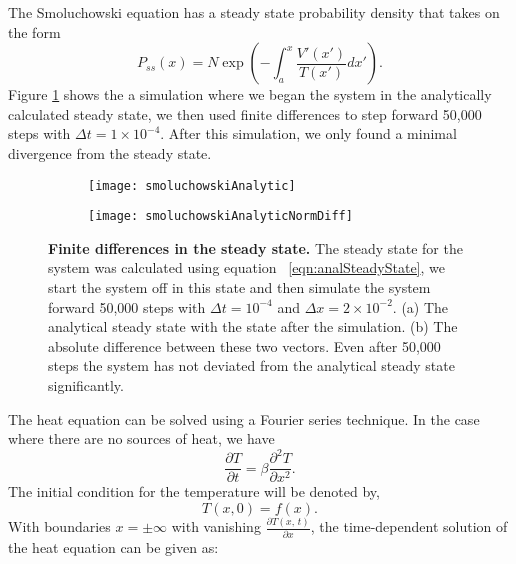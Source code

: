 The Smoluchowski equation has a steady state probability density that takes on the form
\begin{equation}
P_{ss}(x) = N \exp{\left(-\int_a^x \frac{V'(x')}{T(x')} dx' \right)}. \label{eqn:analSteadyState}
\end{equation}
Figure \ref{fig:smoluchowskiCompare} shows the a simulation where we began the system in the analytically calculated steady state, we then used finite differences to step forward 50,000 steps with $\Delta t = 1 \times 10^{-4}$. After this simulation, we only found a minimal divergence from the steady state.
\begin{figure}
	\begin{subfigure}{0.49\textwidth}
	\texttt{[image: smoluchowskiAnalytic]}
	\end{subfigure}
	\begin{subfigure}{0.49\textwidth}
	\texttt{[image: smoluchowskiAnalyticNormDiff]}
	\end{subfigure}
	\caption{\textbf{Finite differences in the steady state.} The steady state for the system was calculated using equation ~\ref{eqn:analSteadyState}, we start the system off in this state and then simulate the system forward 50,000 steps with $\Delta t = 10^{-4}$ and $\Delta x = 2 \times 10^{-2}$. (a) The analytical steady state with the state after the simulation. (b) The absolute difference between these two vectors. Even after 50,000 steps the system has not deviated from the analytical steady state significantly. \label{fig:smoluchowskiCompare}}
\end{figure}

The heat equation can be solved using a Fourier series technique. In the case where there are no sources of heat, we have
\begin{equation}
\frac{\partial T}{\partial t} = \beta \frac{\partial^2 T}{\partial x^2}.
\end{equation}
The initial condition for the temperature will be denoted by,
\begin{equation}
T(x, 0) = f(x).
\end{equation}
With boundaries $x=\pm \infty$ with vanishing $\frac{\partial T(x, \, t)}{\partial x}$, the time-dependent solution of the heat equation can be given as:

